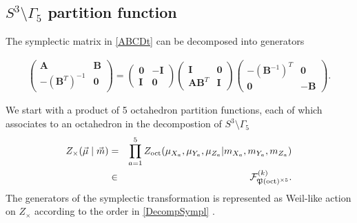 \documentclass[aps,prd,notitlepage,nofootinbib,superscriptaddress,groupedaddress,twocolumn]{revtex4-1}
\def\be{\begin{eqnarray}}
\def\ee{\end{eqnarray}}
\newcommand{\cf}{\mathcal F}
\newcommand{\cx}{\mathcal X}
\newcommand{\cy}{\mathcal Y}
\newcommand{\G}{\Gamma}
\begin{document}
\subsection{$S^3\setminus \G_5$ partition function}\label{S3-G5 partition function}




The symplectic matrix in \eqref{ABCDt} can be decomposed into generators
\begin{widetext}
\be
\left(\begin{array}{ll}
\mathbf{A} & \mathbf{B} \\
-(\mathbf{B}^{T})^{-1} & \mathbf{0}
\end{array}\right)=\left(\begin{array}{cc}
\mathbf{0} & -\mathbf{I} \\
\mathbf{I} & \mathbf{0}
\end{array}\right)\left(\begin{array}{cc}
\mathbf{I} & \mathbf{0} \\
\mathbf{A} \mathbf{B}^{T} & \mathbf{I}
\end{array}\right)\left(\begin{array}{cc}
-\left(\mathbf{B}^{-1}\right)^{T} & \mathbf{0} \\
\mathbf{0} & -\mathbf{B}
\end{array}\right) .\label{DecompSympl}
\ee
\end{widetext}

We start with a product of 5 octahedron partition functions, each of which associates to an octahedron in the decompostion of $S^3\setminus \G_5$
\be
Z_\times(\vec{\mu}\mid \vec{m})&=&\prod_{a=1}^5 Z_{\rm oct}(\mu_{X_a},\mu_{Y_a},\mu_{Z_a}|m_{X_a},m_{Y_a},m_{Z_a})\nonumber\\
&\in& \cf_{\Fp(\mathrm{oct})^{\times 5}}^{(k)}.
\ee
The generators of the symplectic transformation is represented as Weil-like action on $Z_\times$ according to the order in \eqref{DecompSympl} \cite{levelk,Dimofte2011}.
\end{document}
